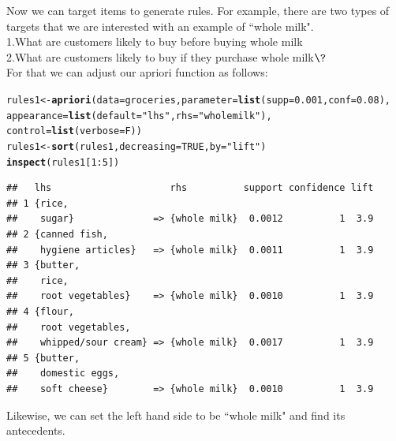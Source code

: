\documentclass{article}\usepackage[]{graphicx}\usepackage[]{color}
\makeatletter
\newcommand{\hlnum}[1]{\textcolor[rgb]{0.686,0.059,0.569}{#1}}%
\newcommand{\hlstr}[1]{\textcolor[rgb]{0.192,0.494,0.8}{#1}}%
\newcommand{\hlopt}[1]{\textcolor[rgb]{0,0,0}{#1}}%
\newcommand{\hlstd}[1]{\textcolor[rgb]{0.345,0.345,0.345}{#1}}%
\newcommand{\hlkwb}[1]{\textcolor[rgb]{0.69,0.353,0.396}{#1}}%
\newcommand{\hlkwc}[1]{\textcolor[rgb]{0.333,0.667,0.333}{#1}}%
\newcommand{\hlkwd}[1]{\textcolor[rgb]{0.737,0.353,0.396}{\textbf{#1}}}%
\newenvironment{kframe}{%
 \def\at@end@of@kframe{}%
 \ifinner\ifhmode%
  \def\at@end@of@kframe{\end{minipage}}%
  \begin{minipage}{\columnwidth}%
 \fi\fi%
 \def\FrameCommand##1{\hskip\@totalleftmargin \hskip-\fboxsep
 \colorbox{shadecolor}{##1}\hskip-\fboxsep
     \hskip-\linewidth \hskip-\@totalleftmargin \hskip\columnwidth}%
 \MakeFramed {\advance\hsize-\width
   \@totalleftmargin\z@ \linewidth\hsize
   \@setminipage}}%
 {\par\unskip\endMakeFramed%
 \at@end@of@kframe}
\newenvironment{knitrout}{}{} %
\makeatother
\begin{document}
Now we can target items to generate rules. For example, there are two types of targets that we are interested with an example of ``whole milk".\\
1.What are customers likely to buy before buying whole milk\\
2.What are customers likely to buy if they purchase whole milk$\?$\\
For that we can adjust our apriori function as follows:
\begin{knitrout}
\color{fgcolor}\begin{kframe}
\begin{alltt}
\hlstd{rules1}\hlkwb{<-}\hlkwd{apriori}\hlstd{(}\hlkwc{data}\hlstd{=groceries,} \hlkwc{parameter}\hlstd{=}\hlkwd{list}\hlstd{(}\hlkwc{supp}\hlstd{=}\hlnum{0.001}\hlstd{,}\hlkwc{conf} \hlstd{=} \hlnum{0.08}\hlstd{),}
               \hlkwc{appearance} \hlstd{=} \hlkwd{list}\hlstd{(}\hlkwc{default}\hlstd{=}\hlstr{"lhs"}\hlstd{,}\hlkwc{rhs}\hlstd{=}\hlstr{"whole milk"}\hlstd{),}
               \hlkwc{control} \hlstd{=} \hlkwd{list}\hlstd{(}\hlkwc{verbose}\hlstd{=F))}
\hlstd{rules1}\hlkwb{<-}\hlkwd{sort}\hlstd{(rules1,} \hlkwc{decreasing}\hlstd{=}\hlnum{TRUE}\hlstd{,}\hlkwc{by}\hlstd{=}\hlstr{"lift"}\hlstd{)}
\hlkwd{inspect}\hlstd{(rules1[}\hlnum{1}\hlopt{:}\hlnum{5}\hlstd{])}
\end{alltt}
\begin{verbatim}
##   lhs                     rhs          support confidence lift
## 1 {rice,                                                      
##    sugar}              => {whole milk}  0.0012          1  3.9
## 2 {canned fish,                                               
##    hygiene articles}   => {whole milk}  0.0011          1  3.9
## 3 {butter,                                                    
##    rice,                                                      
##    root vegetables}    => {whole milk}  0.0010          1  3.9
## 4 {flour,                                                     
##    root vegetables,                                           
##    whipped/sour cream} => {whole milk}  0.0017          1  3.9
## 5 {butter,                                                    
##    domestic eggs,                                             
##    soft cheese}        => {whole milk}  0.0010          1  3.9
\end{verbatim}
\end{kframe}
\end{knitrout}
Likewise, we can set the left hand side to be ``whole milk" and find its antecedents.
\end{document}

